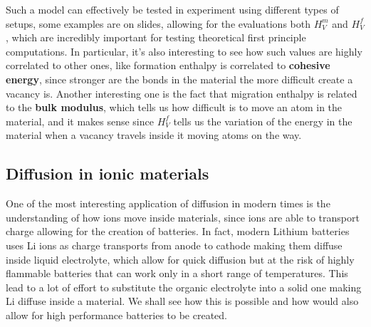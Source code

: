 \nt
{
    Such a model can effectively be tested in experiment using different types of setups, some examples are on slides, allowing for the evaluations both $H_V^m$ and $H_V^f$, which are incredibly important for testing theoretical first principle computations. In particular, it's also interesting to see how such values are highly correlated to other ones, like formation enthalpy is correlated to \textbf{cohesive energy}, since stronger are the bonds in the material the more difficult create a vacancy is. Another interesting one is the fact that migration enthalpy is related to the \textbf{bulk modulus}, which tells us how difficult is to move an atom in the material, and it makes sense since $H_V^f$ tells us the variation of the energy in the material when a vacancy travels inside it moving atoms on the way.
}

\subsection{Diffusion in ionic materials}

One of the most interesting application of diffusion in modern times is the understanding of how ions move inside materials, since ions are able to transport charge allowing for the creation of batteries. In fact, modern Lithium batteries uses Li ions as charge transports from anode to cathode making them diffuse inside liquid electrolyte, which allow for quick diffusion but at the risk of highly flammable batteries that can work only in a short range of temperatures. This lead to a lot of effort to substitute the organic electrolyte into a solid one making Li diffuse inside a material. We shall see how this is possible and how would also allow for high performance batteries to be created.


